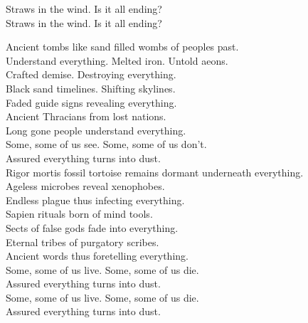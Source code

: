 Straws in the wind. Is it all ending? \\
Straws in the wind. Is it all ending? \\




Ancient tombs like sand filled wombs of peoples  past. \\
Understand everything. Melted iron. Untold aeons. \\
Crafted demise. Destroying everything. \\

Black sand timelines. Shifting skylines. \\
Faded guide signs revealing everything. \\
Ancient Thracians from lost nations. \\
Long gone people understand everything. \\

Some, some of us see. Some, some of us don't. \\
Assured everything turns into dust. \\

Rigor mortis fossil tortoise remains dormant underneath everything. \\
Ageless microbes reveal xenophobes. \\
Endless plague thus infecting everything. \\

Sapien rituals born of mind tools. \\
Sects of false gods fade into everything. \\
Eternal tribes of purgatory scribes. \\
Ancient words thus foretelling everything. \\

Some, some of us live. Some, some of us die. \\
Assured everything turns into dust. \\
Some, some of us live. Some, some of us die. \\
Assured everything turns into dust. \\




